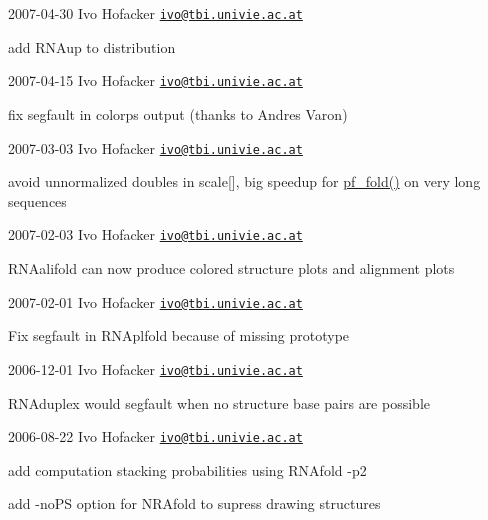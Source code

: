 2007-\/04-\/30 Ivo Hofacker \href{mailto:ivo@tbi.univie.ac.at}{\tt ivo@tbi.\+univie.\+ac.\+at}
\begin{DoxyItemize}
\item add R\+N\+Aup to distribution
\end{DoxyItemize}

2007-\/04-\/15 Ivo Hofacker \href{mailto:ivo@tbi.univie.ac.at}{\tt ivo@tbi.\+univie.\+ac.\+at}
\begin{DoxyItemize}
\item fix segfault in colorps output (thanks to Andres Varon)
\end{DoxyItemize}

2007-\/03-\/03 Ivo Hofacker \href{mailto:ivo@tbi.univie.ac.at}{\tt ivo@tbi.\+univie.\+ac.\+at}
\begin{DoxyItemize}
\item avoid unnormalized doubles in scale\mbox{[}\mbox{]}, big speedup for \hyperlink{group__pf__fold_gadc3db3d98742427e7001a7fd36ef28c2}{pf\+\_\+fold()} on very long sequences
\end{DoxyItemize}

2007-\/02-\/03 Ivo Hofacker \href{mailto:ivo@tbi.univie.ac.at}{\tt ivo@tbi.\+univie.\+ac.\+at}


\begin{DoxyItemize}
\item R\+N\+Aalifold can now produce colored structure plots and alignment plots
\end{DoxyItemize}

2007-\/02-\/01 Ivo Hofacker \href{mailto:ivo@tbi.univie.ac.at}{\tt ivo@tbi.\+univie.\+ac.\+at}


\begin{DoxyItemize}
\item Fix segfault in R\+N\+Aplfold because of missing prototype
\end{DoxyItemize}

2006-\/12-\/01 Ivo Hofacker \href{mailto:ivo@tbi.univie.ac.at}{\tt ivo@tbi.\+univie.\+ac.\+at}


\begin{DoxyItemize}
\item R\+N\+Aduplex would segfault when no structure base pairs are possible
\end{DoxyItemize}

2006-\/08-\/22 Ivo Hofacker \href{mailto:ivo@tbi.univie.ac.at}{\tt ivo@tbi.\+univie.\+ac.\+at}


\begin{DoxyItemize}
\item add computation stacking probabilities using R\+N\+Afold -\/p2
\item add -\/no\+PS option for N\+R\+Afold to supress drawing structures
\end{DoxyItemize}

